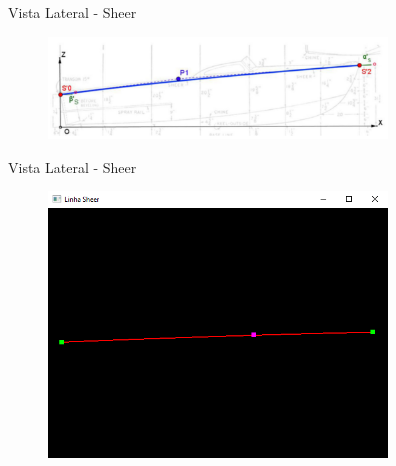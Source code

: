 \documentclass{beamer}
\begin{document}
\begin{frame}{Vista Lateral - Sheer}
\begin{figure}[h]	
	\centering
	\includegraphics[width=9cm]{sheerline}
\end{figure}
\end{frame}

\begin{frame}{Vista Lateral - Sheer}
\begin{figure}[h]	
\centering
\includegraphics[width=9cm]{linhasheer}
\end{figure}
\end{frame}
\end{document}
